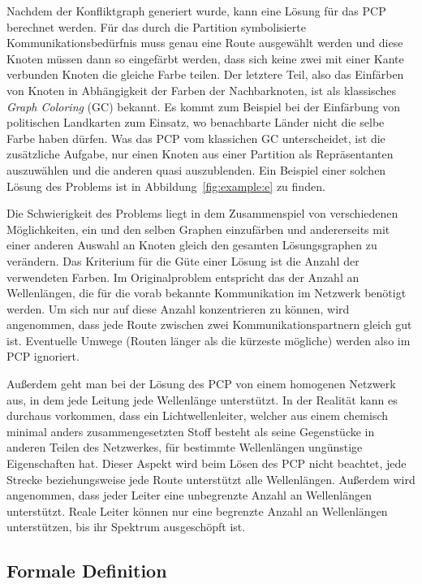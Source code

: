 Nachdem der Konfliktgraph generiert wurde, kann eine Lösung für das PCP berechnet werden. Für das durch die Partition symbolisierte Kommunikationsbedürfnis muss genau eine Route ausgewählt werden und diese Knoten müssen dann so eingefärbt werden, dass sich keine zwei mit einer Kante verbunden Knoten die gleiche Farbe teilen. Der letztere Teil, also das Einfärben von Knoten in Abhängigkeit der Farben der Nachbarknoten, ist als klassisches \textit{Graph Coloring} (GC) bekannt. Es kommt zum Beispiel bei der Einfärbung von politischen Landkarten zum Einsatz, wo benachbarte Länder nicht die selbe Farbe haben dürfen. Was das PCP vom klassichen GC unterscheidet, ist die zusätzliche Aufgabe, nur einen Knoten aus einer Partition als Repräsentanten auszuwählen und die anderen quasi auszublenden. Ein Beispiel einer solchen Lösung des Problems ist in Abbildung~\ref{fig:example:e} zu finden.

Die Schwierigkeit des Problems liegt in dem Zusammenspiel von verschiedenen Möglichkeiten, ein und den selben Graphen einzufärben und andererseits mit einer anderen Auswahl an Knoten gleich den gesamten Lösungsgraphen zu verändern. Das Kriterium für die Güte einer Lösung ist die Anzahl der verwendeten Farben. Im Originalproblem entspricht das der Anzahl an Wellenlängen, die für die vorab bekannte Kommunikation im Netzwerk benötigt werden. Um sich nur auf diese Anzahl konzentrieren zu können, wird angenommen, dass jede Route zwischen zwei Kommunikationspartnern gleich gut ist. Eventuelle Umwege (Routen länger als die kürzeste mögliche) werden also im PCP ignoriert. 

Außerdem geht man bei der Lösung des PCP von einem homogenen Netzwerk aus, in dem jede Leitung jede Wellenlänge unterstützt. In der Realität kann es durchaus vorkommen, dass ein Lichtwellenleiter, welcher aus einem chemisch minimal anders zusammengesetzten Stoff besteht als seine Gegenstücke in anderen Teilen des Netzwerkes, für bestimmte Wellenlängen ungünstige Eigenschaften hat. Dieser Aspekt wird beim Lösen des PCP nicht beachtet, jede Strecke beziehungsweise jede Route unterstützt alle Wellenlängen. Außerdem wird angenommen, dass jeder Leiter eine unbegrenzte Anzahl an Wellenlängen unterstützt. Reale Leiter können nur eine begrenzte Anzahl an Wellenlängen unterstützen, bis ihr Spektrum ausgeschöpft ist.

\subsection{Formale Definition}

